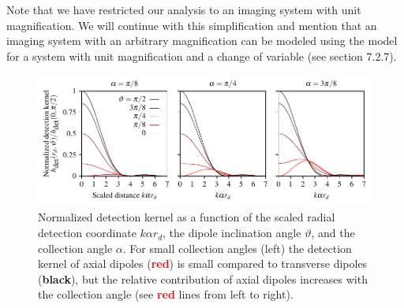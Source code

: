 \documentclass{osa-article}
\begin{document}
Note that we have restricted our analysis to an imaging system with unit
magnification. We will continue with this simplification and mention that an
imaging system with an arbitrary magnification can be modeled using the model
for a system with unit magnification and a change of variable (see
\cite{barrett2004} section 7.2.7).

\begin{figure}[h]
 \centering
   \centering
   \includegraphics[scale=0.8]{../figures/detection/detection.pdf}
   \caption{Normalized detection kernel as a function of the scaled radial
     detection coordinate $k\alpha r_d$, the dipole inclination angle
     $\vartheta$, and the collection angle $\alpha$. For small
     collection angles (left) the detection kernel of axial dipoles
     (\textcolor{red}{\textbf{red}}) is small compared to transverse dipoles
     (\textbf{black}), but the relative contribution of axial dipoles increases
     with the collection angle (see \textcolor{red}{\textbf{red}} lines from
     left to right).}
   \label{fig:hdet}
 \end{figure}
 
\end{document}
